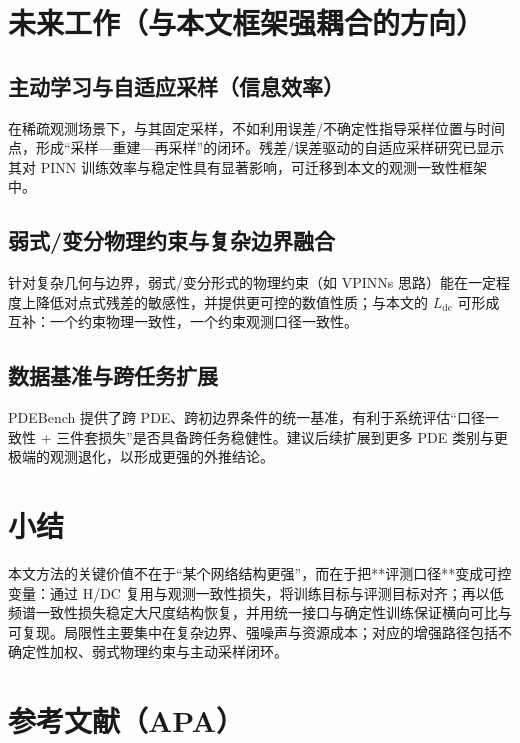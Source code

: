 \section{未来工作（与本文框架强耦合的方向）}

\subsection{主动学习与自适应采样（信息效率）}

在稀疏观测场景下，与其固定采样，不如利用误差/不确定性指导采样位置与时间点，形成“采样—重建—再采样”的闭环。残差/误差驱动的自适应采样研究已显示其对 PINN 训练效率与稳定性具有显著影响，可迁移到本文的观测一致性框架中。

\subsection{弱式/变分物理约束与复杂边界融合}

针对复杂几何与边界，弱式/变分形式的物理约束（如 VPINNs 思路）能在一定程度上降低对点式残差的敏感性，并提供更可控的数值性质；与本文的 \( L_{\text{dc}} \) 可形成互补：一个约束物理一致性，一个约束观测口径一致性。\cite{Berrone2022}

\subsection{数据基准与跨任务扩展}

PDEBench 提供了跨 PDE、跨初边界条件的统一基准，有利于系统评估“口径一致性 + 三件套损失”是否具备跨任务稳健性。建议后续扩展到更多 PDE 类别与更极端的观测退化，以形成更强的外推结论。\cite{takamoto2022pdebench}

\section{小结}

本文方法的关键价值不在于“某个网络结构更强”，而在于把**评测口径**变成可控变量：通过 H/DC 复用与观测一致性损失，将训练目标与评测目标对齐；再以低频谱一致性损失稳定大尺度结构恢复，并用统一接口与确定性训练保证横向可比与可复现。局限性主要集中在复杂边界、强噪声与资源成本；对应的增强路径包括不确定性加权、弱式物理约束与主动采样闭环。

\section{参考文献（APA）}

